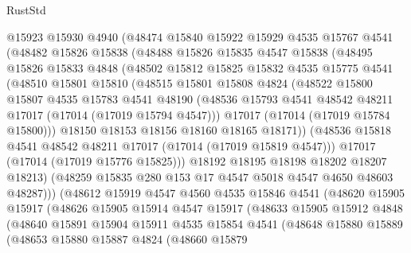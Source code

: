 \begin{lexlean}{RustStd}
\begin{coremodule}
        @15923
        @15930
        @4940
        (@48474
          @15840
          @15922
          @15929
          @4535
          @15767
          @4541
          (@48482
            @15826
            @15838
            (@48488
              @15826
              @15835
              @4547
              @15838
              (@48495
                @15826
                @15833
                @4848
                (@48502
                  @15812
                  @15825
                  @15832
                  @4535
                  @15775
                  @4541
                  (@48510
                    @15801
                    @15810
                    (@48515
                      @15801
                      @15808
                      @4824
                      (@48522
                        @15800
                        @15807
                        @4535
                        @15783
                        @4541
                        @48190
                        (@48536 @15793 @4541 @48542 @48211 @17017 (@17014 (@17019 @15794 @4547)))
                        @17017
                        (@17014 (@17019 @15784 @15800)))
                      @18150
                      @18153
                      @18156
                      @18160
                      @18165
                      @18171))
                  (@48536 @15818 @4541 @48542 @48211 @17017 (@17014 (@17019 @15819 @4547)))
                  @17017
                  (@17014 (@17019 @15776 @15825)))
                @18192
                @18195
                @18198
                @18202
                @18207
                @18213)
              (@48259 @15835 @280 @153 @17 @4547 @5018 @4547 @4650 @48603 @48287)))
          (@48612
            @15919
            @4547
            @4560
            @4535
            @15846
            @4541
            (@48620
              @15905
              @15917
              (@48626
                @15905
                @15914
                @4547
                @15917
                (@48633
                  @15905
                  @15912
                  @4848
                  (@48640
                    @15891
                    @15904
                    @15911
                    @4535
                    @15854
                    @4541
                    (@48648
                      @15880
                      @15889
                      (@48653
                        @15880
                        @15887
                        @4824
                        (@48660
                          @15879

\end{coremodule}
\end{lexlean}
